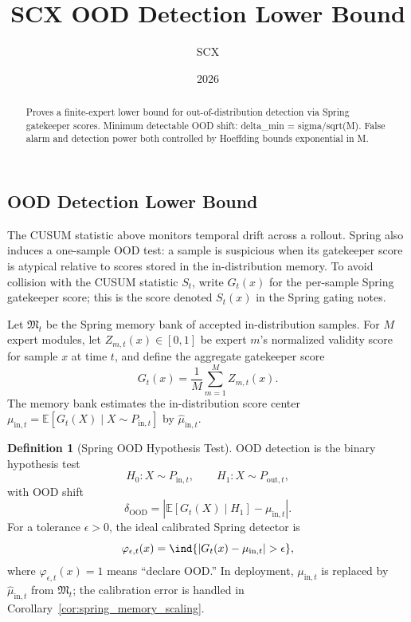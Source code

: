 \documentclass[11pt,a4paper]{article}
\title{SCX OOD Detection Lower Bound}
\author{SCX}
\date{2026}
\theoremstyle{definition}
\newtheorem{definition}[theorem]{Definition}
\newcommand{\E}{\mathbb{E}}
\begin{document}
\maketitle

\begin{abstract}
Proves a finite-expert lower bound for out-of-distribution detection via Spring gatekeeper scores. Minimum detectable OOD shift: delta_min = sigma/sqrt(M). False alarm and detection power both controlled by Hoeffding bounds exponential in M.
\end{abstract}
\subsection{OOD Detection Lower Bound}
\label{subsec:spring_ood}

The CUSUM statistic above monitors temporal drift across a rollout.  Spring
also induces a one-sample OOD test: a sample is suspicious when its gatekeeper
score is atypical relative to scores stored in the in-distribution memory.  To
avoid collision with the CUSUM statistic $S_t$, write $G_t(x)$ for the
per-sample Spring gatekeeper score; this is the score denoted $S_t(x)$ in the
Spring gating notes.

Let $\mathfrak{M}_t$ be the Spring memory bank of accepted in-distribution
samples.  For $M$ expert modules, let $Z_{m,t}(x) \in [0,1]$ be expert $m$'s
normalized validity score for sample $x$ at time $t$, and define the aggregate
gatekeeper score
\begin{equation}
  G_t(x) = \frac{1}{M}\sum_{m=1}^{M} Z_{m,t}(x).
  \label{eq:spring_gate_score}
\end{equation}
The memory bank estimates the in-distribution score center
$\mu_{\mathrm{in},t} = \E[G_t(X)\mid X \sim P_{\mathrm{in},t}]$ by
$\widehat{\mu}_{\mathrm{in},t}$.

\begin{definition}[Spring OOD Hypothesis Test]
\label{def:spring_ood_test}
OOD detection is the binary hypothesis test
\begin{equation}
  H_0: X \sim P_{\mathrm{in},t},
  \qquad
  H_1: X \sim P_{\mathrm{out},t},
\end{equation}
with OOD shift
\begin{equation}
  \delta_{\mathrm{OOD}}
  =
  \left|
  \E[G_t(X)\mid H_1]
  -
  \mu_{\mathrm{in},t}
  \right|.
\end{equation}
For a tolerance $\epsilon > 0$, the ideal calibrated Spring detector is
\begin{equation}
  \varphi_{\epsilon,t}(x)
  =
  \ind{\left|G_t(x)-\mu_{\mathrm{in},t}\right|>\epsilon},
  \label{eq:spring_ood_test}
\end{equation}
where $\varphi_{\epsilon,t}(x)=1$ means ``declare OOD.''  In deployment,
$\mu_{\mathrm{in},t}$ is replaced by $\widehat{\mu}_{\mathrm{in},t}$ from
$\mathfrak{M}_t$; the calibration error is handled in
Corollary~\ref{cor:spring_memory_scaling}.
\end{definition}
\end{document}

